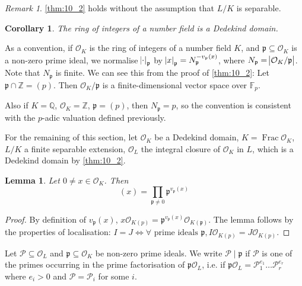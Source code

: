 \documentclass[11pt]{article}
\theoremstyle{definition}
\theoremstyle{plain}
\newtheorem{lemma}[definition]{Lemma}
\newtheorem{corollary}[definition]{Corollary}
\theoremstyle{remark}
\newtheorem*{remark}{Remark}
\DeclareMathOperator{\Frac}{Frac}
\newcommand{\FF}{\mathbb{F}}
\newcommand{\ZZ}{\mathbb{Z}}
\newcommand{\QQ}{\mathbb{Q}}
\newcommand{\cO}{\mathcal{O}}
\newcommand{\cP}{\mathcal{P}}
\newcommand{\fp}{\mathfrak{p}}
\begin{document}
\begin{remark}
    \autoref{thm:10_2} holds without the assumption that $L / K$ is separable.
\end{remark}

\begin{corollary}\label{cor:10_3}
    The ring of integers of a number field is a Dedekind domain.
\end{corollary}

As a convention, if $\cO_K$ is the ring of integers of a number field $K$, and $\fp \subseteq \cO_K$ is a non-zero prime ideal, we normalise $\abs{\cdot}_\fp$ by $\abs{x}_\fp = N_\fp^{-v_\fp(x)}$, where $N_\fp = \abs{\cO_K / \fp}$. Note that $N_\fp$ is finite. We can see this from the proof of \autoref{thm:10_2}: Let $\fp \cap \ZZ = (p)$. Then $\cO_K / \fp$ is a finite-dimensional vector space over $\FF_p$.

Also if $K = \QQ$, $\cO_K = \ZZ$, $\fp = (p)$, then $N_\fp = p$, so the convention is consistent with the $p$-adic valuation defined previously.

For the remaining of this section, let $\cO_K$ be a Dedekind domain, $K = \Frac{\cO_K}$, $L / K$ a finite separable extension, $\cO_L$ the integral closure of $\cO_K$ in $L$, which is a Dedekind domain by \autoref{thm:10_2}.

\begin{lemma}\label{lem:10_4}
    Let $0 \neq x \in \cO_K$. Then
    \begin{equation*}
        (x) = \prod_{\fp \neq 0} \fp^{v_\fp(x)}
    \end{equation*}
\end{lemma}
\begin{proof}
    By definition of $v_\fp(x)$, $x \cO_{K(p)} = \fp^{v_\fp(x)} \cO_{K(\fp)}$. The lemma follows by the properties of localisation: $I = J \iff \forall \text{ prime ideals } \fp, I \cO_{K(p)} = J \cO_{K(p)}$.
\end{proof}

Let $\cP \subseteq \cO_L$ and $\fp \subseteq \cO_K$ be non-zero prime ideals. We write $\cP \mid \fp$ if $\cP$ is one of the primes occurring in the prime factorisation of $\fp \cO_L$, i.e. if $\fp \cO_L = \cP_1^{e_1} \ldots \cP_r^{e_r}$ where $e_i > 0$ and $\cP = \cP_i$ for some $i$.
\end{document}
